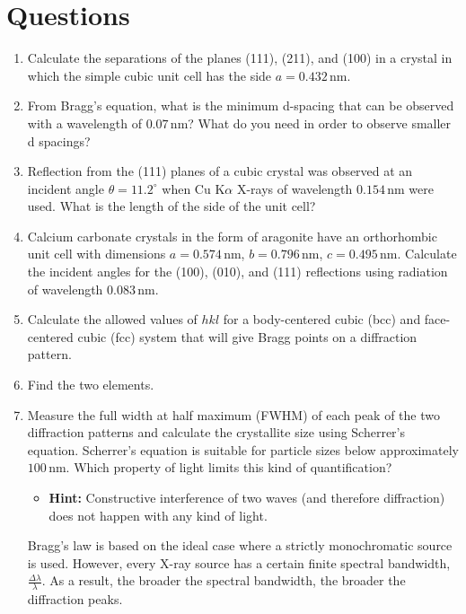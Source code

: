 \section{Questions}

\begin{enumerate}
    \item Calculate the separations of the planes (111), (211), and (100) in a crystal in which the simple cubic unit cell has the side \( a = 0.432 \, \text{nm} \).
    \item From Bragg’s equation, what is the minimum d-spacing that can be observed with a wavelength of \( 0.07 \, \text{nm} \)? What do you need in order to observe smaller d spacings?
    \item Reflection from the (111) planes of a cubic crystal was observed at an incident angle \( \theta = 11.2^\circ \) when Cu K\(\alpha\) X-rays of wavelength \( 0.154 \, \text{nm} \) were used. What is the length of the side of the unit cell?
    \item Calcium carbonate crystals in the form of aragonite have an orthorhombic unit cell with dimensions \( a = 0.574 \, \text{nm} \), \( b = 0.796 \, \text{nm} \), \( c = 0.495 \, \text{nm} \). Calculate the incident angles for the (100), (010), and (111) reflections using radiation of wavelength \( 0.083 \, \text{nm} \).
    \item Calculate the allowed values of \( hkl \) for a body-centered cubic (bcc) and face-centered cubic (fcc) system that will give Bragg points on a diffraction pattern.
    \item Find the two elements.
    \item Measure the full width at half maximum (FWHM) of each peak of the two diffraction patterns and calculate the crystallite size using Scherrer’s equation. Scherrer’s equation is suitable for particle sizes below approximately \( 100 \, \text{nm} \). Which property of light limits this kind of quantification? 
    \begin{itemize}
        \item \textbf{Hint:} Constructive interference of two waves (and therefore diffraction) does not happen with any kind of light.
    \end{itemize}
    Bragg’s law is based on the ideal case where a strictly monochromatic source is used. However, every X-ray source has a certain finite spectral bandwidth, \( \frac{\Delta \lambda}{\lambda} \). As a result, the broader the spectral bandwidth, the broader the diffraction peaks.
    

\end{enumerate}
